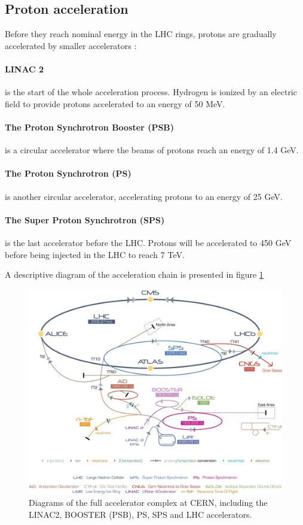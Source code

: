 \subsection{Proton acceleration}

Before they reach nominal energy in the LHC rings, protons are gradually accelerated by smaller accelerators :

\paragraph{LINAC 2} is the start of the whole acceleration process. Hydrogen is ionized by an electric field to provide protons accelerated to an energy of 50 MeV.

\paragraph{The Proton Synchrotron Booster (PSB)} is a circular accelerator where the beams of protons reach an energy of 1.4 GeV.

\paragraph{The Proton Synchrotron (PS)} is another circular accelerator, accelerating protons to an energy of 25 GeV.

\paragraph{The Super Proton Synchrotron (SPS)} is the last accelerator before the LHC. Protons will be accelerated to 450 GeV before being injected in the LHC to reach 7 TeV.

A descriptive diagram of the acceleration chain is presented in figure \ref{fig:LHC_acceleration}

\begin{figure}
    \centering
    \includegraphics[width=\textwidth]{Images/CERN_accelerators.jpg}
    \caption{Diagrams of the full accelerator complex at CERN, including the LINAC2, BOOSTER (PSB), PS, SPS and LHC accelerators.}
    \label{fig:LHC_acceleration}
\end{figure}

